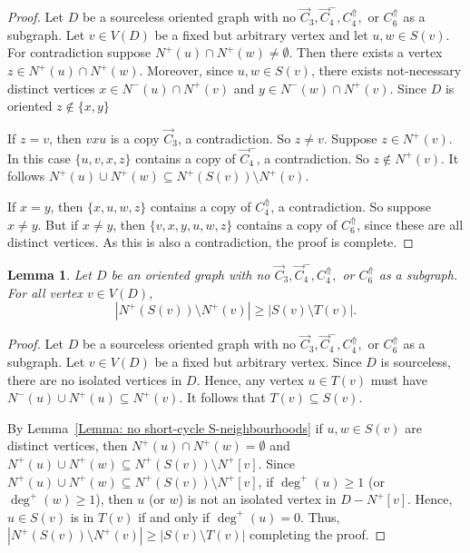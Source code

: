 \documentclass[12pt]{article}
\newtheorem{lemma}[theorem]{Lemma}
\theoremstyle{definition}
\begin{document}
\begin{proof}
    Let $D$ be a sourceless oriented graph with no $\Vec{C}_3, \Vec{C}^{-}_4,C_4^{\Uparrow},$ or $C_6^{\Uparrow}$ as a subgraph.
    Let $v \in V(D)$ be a fixed but arbitrary vertex and let $u,w \in S(v)$.
    For contradiction suppose $N^+(u)\cap N^+(w) \neq \emptyset$.
    Then there exists a vertex $z \in N^+(u)\cap N^+(w)$.
    Moreover, since $u,w \in S(v)$, there exists not-necessary distinct vertices $x \in N^-(u)\cap N^+(v)$
    and $y \in N^-(w)\cap N^+(v)$.
    Since $D$ is oriented $z \notin \{x,y\}$
    
    If $z  = v$, then $vxu$ is a copy $\Vec{C}_3$, a contradiction.
    So $z \neq v$.
    Suppose $z \in N^+(v)$.
    In this case $\{u,v,x,z\}$ contains a copy of $\Vec{C}^{-}_4$, a contradiction.
    So $z \notin N^+(v)$.
    It follows $N^+(u)\cup N^+(w) \subseteq N^+(S(v))\setminus N^+(v)$.

    If $x = y$, then $\{x,u,w,z\}$ contains a copy of $C_4^{\Uparrow}$,
    a contradiction. So suppose $x\neq y$.
    But if $x\neq y$, then $\{v,x,y,u,w,z\}$ contains a copy of $C_6^{\Uparrow}$, since these are all distinct vertices.
    As this is also a contradiction, the proof is complete.
\end{proof}


\begin{lemma}\label{Lemma: T-set}
    Let $D$ be an oriented graph with no $\Vec{C}_3, \Vec{C}^{-}_4,C_4^{\Uparrow},$ or $C_6^{\Uparrow}$ as a subgraph.
    For all vertex $v \in V(D)$,
    \[
    |N^+(S(v))\setminus N^+(v)| \geq |S(v)\setminus T(v)|.
    \]
\end{lemma}

\begin{proof}
    Let $D$ be a sourceless oriented graph with no $\Vec{C}_3, \Vec{C}^{-}_4,C_4^{\Uparrow},$ or $C_6^{\Uparrow}$ as a subgraph.
    Let $v \in V(D)$ be a fixed but arbitrary vertex.
    Since $D$ is sourceless, there are no isolated vertices in $D$.
    Hence, any vertex $u \in T(v)$ must have $N^-(u)\cup N^+(u) \subseteq N^+(v)$.
    It follows that $T(v) \subseteq S(v)$.
    
    By Lemma~\ref{Lemma: no short-cycle S-neighbourhoods}
    if $u,w \in S(v)$ are distinct vertices, then $N^+(u)\cap N^+(w) = \emptyset$ and $N^+(u)\cup N^+(w) \subseteq N^+(S(v))\setminus N^+[v]$.
    Since $N^+(u)\cup N^+(w) \subseteq N^+(S(v))\setminus N^+[v]$,
    if $\deg^+(u)\geq 1$ (or $\deg^+(w)\geq 1$), then $u$ (or $w$) is not an isolated vertex in $D-N^+[v]$.
    Hence, $u \in S(v)$ is in $T(v)$ if and only if $\deg^+(u) = 0$.
    Thus, $|N^+(S(v))\setminus N^+(v)| \geq |S(v)\setminus T(v)|$
    completing the proof.
\end{proof}
\end{document}
